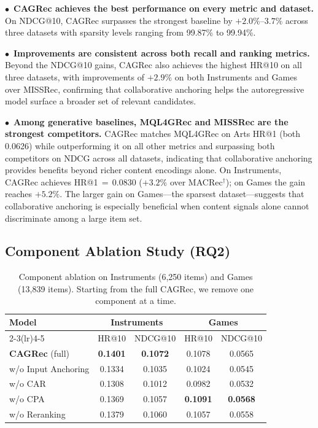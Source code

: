 \documentclass[sigconf, anonymous, review]{acmart}
\begin{document}
\noindent$\bullet$~\textbf{CAGRec achieves the best performance on every metric and dataset.}
%
On NDCG@10, CAGRec surpasses the strongest baseline by $+2.0\%$--$3.7\%$ across three datasets with sparsity levels ranging from 99.87\% to 99.94\%.

\noindent$\bullet$~\textbf{Improvements are consistent across both recall and ranking metrics.}
%
Beyond the NDCG@10 gains, CAGRec also achieves the highest HR@10 on all three datasets, with improvements of $+2.9\%$ on both Instruments and Games over MISSRec, confirming that collaborative anchoring helps the autoregressive model surface a broader set of relevant candidates.

\noindent$\bullet$~\textbf{Among generative baselines, MQL4GRec and MISSRec are the strongest competitors.}
%
CAGRec matches MQL4GRec on Arts HR@1 (both 0.0626) while outperforming it on all other metrics and surpassing both competitors on NDCG across all datasets, indicating that collaborative anchoring provides benefits beyond richer content encodings alone.
%
On Instruments, CAGRec achieves HR@1$\,=\,$0.0830 ($+3.2\%$ over MACRec$^\dagger$); on Games the gain reaches $+5.2\%$.
%
The larger gain on Games---the sparsest dataset---suggests that collaborative anchoring is especially beneficial when content signals alone cannot discriminate among a large item set.

\subsection{Component Ablation Study (RQ2)}
\label{sec:rq2}

\begin{table}[t]
\caption{Component ablation on Instruments (6{,}250 items) and Games (13{,}839 items). Starting from the full CAGRec, we remove one component at a time.}
\label{tab:ablation}
\centering
\setlength\tabcolsep{4pt}
\small
\begin{tabular}{l|cc|cc}
\toprule
\multirow{2}{*}{Model} & \multicolumn{2}{c|}{Instruments} & \multicolumn{2}{c}{Games} \\
\cmidrule(lr){2-3}\cmidrule(lr){4-5}
 & HR@10 & NDCG@10 & HR@10 & NDCG@10 \\
\midrule
\textbf{CAGRec} (full)  & \textbf{0.1401} & \textbf{0.1072} & 0.1078 & 0.0565              \\
\;\;w/o Input Anchoring  & 0.1334          & 0.1035          & 0.1024       & 0.0545              \\
\;\;w/o CAR              & 0.1308          & 0.1012          & 0.0982       & 0.0532              \\
\;\;w/o CPA              & 0.1369          & 0.1057          & \textbf{0.1091}  & \textbf{0.0568}              \\
\;\;w/o Reranking        & 0.1379          & 0.1060          & 0.1057       & 0.0558              \\
\bottomrule
\end{tabular}
\end{table}
\end{document}
